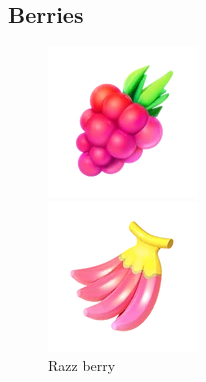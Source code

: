 \subsection{Berries}
\label{sec:berries}
\begin{figure}[h!]
  \begin{minipage}[t]{0.3\textwidth}
    \begin{center}
    \includegraphics[width=\textwidth]{images/razz.png}
    \end{center}
    \caption*{Razz berry}
    \label{fig:razz}
  \end{minipage}
  \begin{minipage}[t]{0.3\textwidth}
    \begin{center}
    \includegraphics[width=\textwidth]{images/nanab.png}

\end{center}
\end{minipage}
\end{figure}
